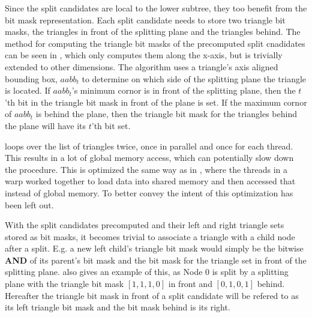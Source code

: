 
Since the split candidates are local to the lower subtree, they too benefit from
the bit mask representation. Each split candidate needs to store two triangle
bit masks, the triangles in front of the splitting plane and the triangles
behind. The method for computing the triangle bit masks of the precomputed split
cnadidates can be seen in , which only computes
them along the x-axis, but is trivially extended to other dimensions. The
algorithm uses a triangle's axis aligned bounding box, $aabb_t$ to determine on
which side of the splitting plane the triangle is located. If $aabb_t$'s minimum
cornor is in front of the splitting plane, then the $t$'th bit in the triangle
bit mask in front of the plane is set. If the maximum cornor of $aabb_t$ is
behind the plane, then the triangle bit mask for the triangles behind the plane
will have its $t$'th bit set.


 loops over the list of triangles twice, once in
parallel and once for each thread. This results in a lot of global memory
access, which can potentially slow down the procedure. This is optimized the
same way as in , where the threads in a warp
worked together to load data into shared memory and then accessed that instead
of global memory. To better convey the intent of
 this optimization has been left out.



With the split candidates precomputed and their left and right triangle sets
stored as bit masks, it becomes trivial to associate a triangle with a child
node after a split. E.g. a new left child's triangle bit mask would simply be
the bitwise \textbf{AND} of its parent's bit mask and the bit mask for the
triangle set in front of the splitting plane.  also gives an
example of this, as Node 0 is split by a splitting plane with the triangle bit
mask $[1,1,1,0]$ in front and $[0,1,0,1]$ behind. Hereafter the triangle bit
mask in front of a split candidate will be refered to as its left triangle bit
mask and the bit mask behind is its right.

